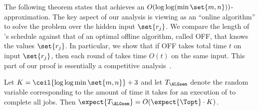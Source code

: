 The following theorem states that \ALGsem achieves an $O(\log\log(\min
\set{m,n}))$-approximation.  The key aspect of our analysis is viewing
\ALGsem as an ``online algorithm'' to solve the \suureform problem
over the hidden input $\set{r_j}$.
  We compare the length of \ALGsem's schedule against that of
an optimal offline algorithm, called OFF, that knows the values
$\set{r_j}$.  In particular, we show that if OFF takes total time $t$
on input $\set{r_j}$, then each round of \ALGsem takes time $O(t)$ on
the same input.  This part of our proof is essentially a competitive
analysis~\cite{SleatorTa85}.


\newcommand{\indepmthm}{
\begin{theorem} \thmlabel{indepalg}
  Let $K = \ceil{\log\log \min \set{m,n}}+3$ and let
  $T_{\ALGsem}$ denote the random variable corresponding to
  the amount of time it takes for an execution of \ALGsem to complete
  all jobs. Then $\expect{T_{\ALGsem}} = O(\expect{\Topt}\cdot K)$. 
\end{theorem}
}
\indepmthm
